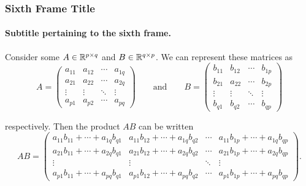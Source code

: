\documentclass[aspectratio=169]{beamer}
\begin{document}
\begin{frame}
\frametitle{Sixth Frame Title}
\framesubtitle{Subtitle pertaining to the sixth frame.}

Consider some $A \in \mathbb{R}^{p \times q}$ and $B \in \mathbb{R}^{q \times p}$. We can represent these matrices as
\begin{equation*}
    A = \begin{pmatrix} a_{11} & a_{12} & \cdots & a_{1q} \\ a_{21} & a_{22} & \cdots & a_{2q} \\ \vdots & \vdots & \ddots & \vdots \\ a_{p1} & a_{p2} & \cdots & a_{pq} \end{pmatrix} \qquad \text{and} \qquad B = \begin{pmatrix} b_{11} & b_{12} & \cdots & b_{1p} \\ b_{21} & a_{22} & \cdots & b_{2p} \\ \vdots & \vdots & \ddots & \vdots \\ b_{q1} & b_{q2} & \cdots & b_{qp} \end{pmatrix}
\end{equation*}

respectively. Then the product $AB$ can be written
\begin{equation*}
    AB = \begin{pmatrix} a_{11} b_{11} + \cdots + a_{1q} b_{q1} & a_{11} b_{12} + \cdots + a_{1q} b_{q2} & \cdots & a_{11} b_{1p} + \cdots + a_{1q} b_{qp} \\ a_{21} b_{11} + \cdots + a_{2q} b_{q1} & a_{21} b_{12} + \cdots + a_{2q} b_{q2} & \cdots & a_{21} b_{1p} + \cdots + a_{2q} b_{qp} \\ \vdots & \vdots & \ddots & \vdots \\ a_{p1} b_{11} + \cdots + a_{pq} b_{q1} & a_{p1} b_{12} + \cdots + a_{pq} b_{q2} & \cdots & a_{p1} b_{1p} + \cdots + a_{pq} b_{qp} \end{pmatrix}.
\end{equation*}

\end{frame}
\end{document}
